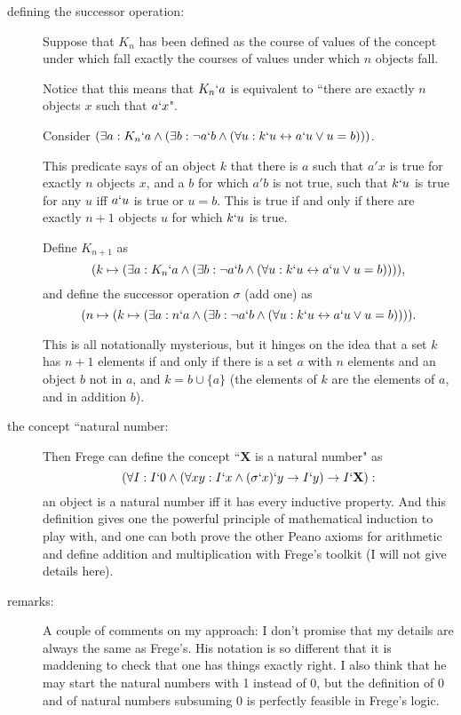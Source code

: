 \documentclass[12pt]{article}
\begin{document}
\begin{description}
\begin{description}
\item[defining the successor operation:]  Suppose that $K_n$ has been defined as the course of values of the concept under which fall exactly the courses of values under which $n$ objects fall.  

Notice that this means that $K_n`a$ is equivalent to ``there are exactly $n$ objects $x$ such that $a`x$".

Consider $(\exists a:K_n`a \wedge (\exists b: \neg a`b \wedge (\forall u:k`u \leftrightarrow a`u \vee u=b)))$.

This predicate says of an object $k$ that there is $a$ such that $a'x$ is true for exactly $n$ objects $x$,  and a $b$ for which $a'b$ is not true, such that $k`u$ is true for any $u$ iff $a`u$ is true or $u=b$.  This is true if and only if there are exactly $n+1$ objects $u$ for which $k`u$ is true.

Define $K_{n+1}$ as $$(k \mapsto (\exists a:K_n`a \wedge (\exists b: \neg a`b \wedge (\forall u:k`u \leftrightarrow a`u \vee u=b)))),$$ and define
the successor operation $\sigma$ (add one) as $$(n \mapsto (k \mapsto (\exists a:n`a \wedge (\exists b: \neg a`b \wedge (\forall u:k`u \leftrightarrow a`u \vee u=b)))).$$

This is all notationally mysterious, but it hinges on the idea that a set $k$ has $n+1$ elements if and only if there is a set $a$ with $n$ elements and an object $b$ not in $a$,
and $k = b \cup \{a\}$ (the elements of $k$ are the elements of $a$, and in addition $b$).

\item[the concept ``natural number:]  Then Frege can define the concept ``{\bf X} is a natural number" as $$(\forall I:I`0 \wedge (\forall xy:I`x \wedge (\sigma`x)`y \rightarrow I`y) \rightarrow I`{\bf X}):$$  an object is a natural number iff it has every inductive property.  And this definition gives one the powerful principle of mathematical induction to play with, and one can both prove the other Peano axioms for arithmetic and define addition and multiplication with Frege's toolkit (I will not give details here).

\item[remarks:]  A couple of comments on my approach:  I don't promise that my details are always the same as Frege's.  His notation is so different that it is maddening to check that one has things exactly right.  I also think that he may start the natural numbers with 1 instead of 0, but the definition of 0 and of natural numbers subsuming 0 is perfectly feasible in Frege's logic. 


\end{description}
\end{description}
\end{document}
